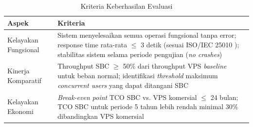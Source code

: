\begin{table}[H]
\centering
\caption{Kriteria Keberhasilan Evaluasi}
\label{tab:success-criteria}
\small
\begin{tabular}{|p{3.5cm}|p{9.5cm}|}
\hline
\textbf{Aspek} & \textbf{Kriteria} \\ \hline
Kelayakan Fungsional & Sistem menyelesaikan semua operasi fungsional tanpa error; response time rata-rata $\leq$ 3 detik (sesuai ISO/IEC 25010 \cite{iso25010}); stabilitas sistem selama periode pengujian (\textit{no crashes}) \\ \hline
Kinerja Komparatif & Throughput SBC $\geq$ 50\% dari throughput VPS \textit{baseline} untuk beban normal; identifikasi \textit{threshold} maksimum \textit{concurrent users} yang dapat ditangani SBC \\ \hline
Kelayakan Ekonomi & \textit{Break-even point} TCO SBC vs. VPS komersial $\leq$ 24 bulan; TCO SBC untuk periode 5 tahun lebih rendah minimal 30\% dibandingkan VPS komersial \\ \hline
\end{tabular}
\end{table}
